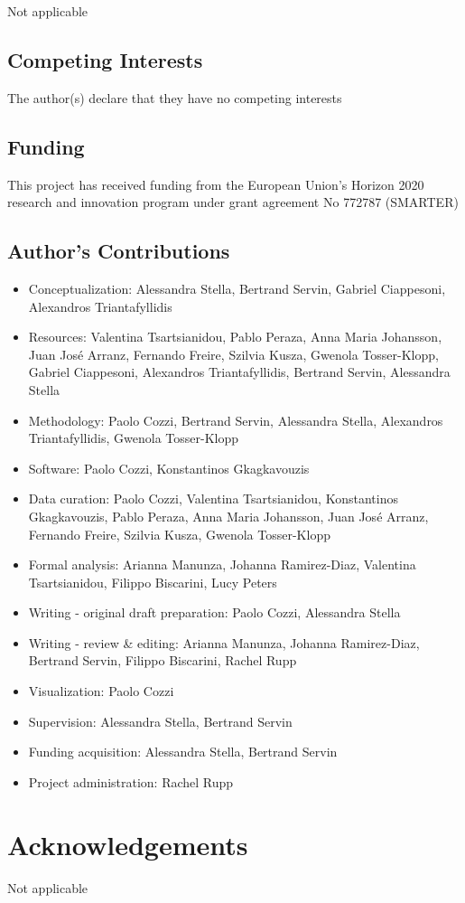 \documentclass[a4paper,num-refs,gigabyte]{oup-contemporary}
\begin{document}
Not applicable

\subsection{Competing Interests}

The author(s) declare that they have no competing interests

\subsection{Funding}

This project has received funding from the European Union’s Horizon 2020 research and innovation program under grant agreement No 772787 (SMARTER)

\subsection{Author's Contributions}

\begin{itemize}
\item Conceptualization: Alessandra Stella, Bertrand Servin, Gabriel Ciappesoni, Alexandros Triantafyllidis
\item Resources: Valentina Tsartsianidou, Pablo Peraza, {Anna Maria} Johansson, {Juan José} Arranz, Fernando Freire, Szilvia Kusza, Gwenola Tosser-Klopp, Gabriel Ciappesoni, Alexandros Triantafyllidis, Bertrand Servin, Alessandra Stella
\item Methodology: Paolo Cozzi, Bertrand Servin, Alessandra Stella, Alexandros Triantafyllidis, Gwenola Tosser-Klopp
\item Software: Paolo Cozzi, Konstantinos Gkagkavouzis
\item Data curation: Paolo Cozzi, Valentina Tsartsianidou, Konstantinos Gkagkavouzis, Pablo Peraza, {Anna Maria} Johansson, {Juan José} Arranz, Fernando Freire, Szilvia Kusza, Gwenola Tosser-Klopp
\item Formal analysis: Arianna Manunza, Johanna Ramirez-Diaz, Valentina Tsartsianidou, Filippo Biscarini, Lucy Peters
\item Writing - original draft preparation: Paolo Cozzi, Alessandra Stella
\item Writing - review \& editing: Arianna Manunza, Johanna Ramirez-Diaz, Bertrand Servin, Filippo Biscarini, Rachel Rupp
\item Visualization: Paolo Cozzi
\item Supervision: Alessandra Stella, Bertrand Servin
\item Funding acquisition: Alessandra Stella, Bertrand Servin
\item Project administration: Rachel Rupp
\end{itemize}

\section{Acknowledgements}

Not applicable


\end{document}
